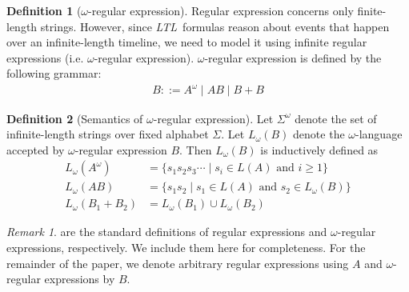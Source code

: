 \documentclass[conference]{IEEEtran}
\theoremstyle{definition}
\newtheorem{definition}{Definition}[section]
\theoremstyle{remark}
\newtheorem{remark}{Remark}[section]
\newcommand{\ltl}{\textit{LTL}}
\begin{document}
\begin{definition}[$\omega$-regular expression]\label{def:omega-regex}
    Regular expression concerns only finite-length strings. However, since \ltl\ formulas reason about events that happen over an infinite-length timeline, we need to model it using infinite regular expressions (i.e. $\omega$-regular expression). $\omega$-regular expression is defined by the following grammar:
    \begin{align*}
        B ::= A^{\omega} \mid AB \mid B + B
    \end{align*}
\end{definition}
\begin{definition}[Semantics of $\omega$-regular expression]\label{def:omega-semantics}
    Let $\Sigma^{\omega}$ denote the set of infinite-length strings over fixed alphabet $\Sigma$. Let $L_{\omega}(B)$ denote the $\omega$-language accepted by $\omega$-regular expression $B$. Then $L_{\omega}(B)$ is inductively defined as
    \begin{align*}
        L_{\omega}(A^{\omega}) & = \{s_1s_2s_3\cdots \mid s_i \in L(A) \text{ and } i \ge 1\} \tag{$\epsilon
         \not\in L(A)$} \\
        L_{\omega}(AB) & = \{s_1s_2 \mid s_1 \in L(A) \text{ and } s_2 \in L_{\omega}(B)\} \\
        L_{\omega}(B_1 + B_2) &= L_{\omega}(B_1) \cup L_{\omega}(B_2)
    \end{align*}
\end{definition}

\begin{remark}
   are the standard definitions of regular expressions and $\omega$-regular expressions, respectively.  We include them here for completeness. For the remainder of the paper, we denote arbitrary regular expressions using $A$ and $\omega$-regular expressions by $B$.
\end{remark}
\end{document}
